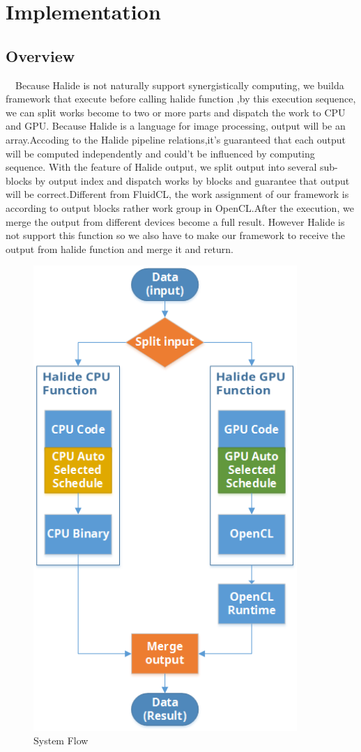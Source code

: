 \chapter{Implementation}
\section{Overview}
\quad \ \ Because Halide is not naturally support synergistically computing, we builda framework that execute before calling halide function ,by this execution sequence, we can split works become to two or more parts and dispatch the work to CPU and GPU. Because Halide is a language for image processing, output will be an array.Accoding to the Halide pipeline relations,it's guaranteed that each output will be computed independently and could't be influenced by computing sequence.
With the feature of Halide output, we split output into several sub-blocks by output index and dispatch works by blocks and guarantee that output will be correct.Different from FluidCL, the work assignment of our framework is according to output blocks rather work group in OpenCL.After the execution, we merge the output from different devices become a full result. However Halide is not support this function so we also have to make our framework to receive the output from halide function and merge it and return.

\begin{figure}[!hbtp]
\centering
\includegraphics[width=10cm]{img/Framework-SystemFlow.png}
\caption{System Flow}
\label{fig:my_label}
\end{figure}

